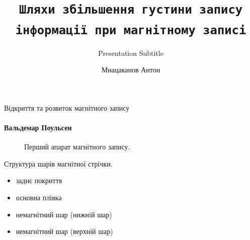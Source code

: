 \documentclass{beamer}
\title{\texttt{Шляхи збiльшення густини запису iнформацiї при магнiтному записi}} %
\subtitle{Presentation Subtitle} %
\author{Мнацаканов Антон}
\begin{document}
  \shorthandoff{-}
  \frame[c]{\maketitle}



    \begin{frame}{Відкриття та розвиток магнітного запису}
      \framesubtitle{Вальдемар Поульсен}%
        \begin{figure}[h]
          \caption{Перший апарат магнітного запису.}
          
        \end{figure}
    \end{frame}
    \begin{frame}[label=lists]{Структура шарів магнітної стрічки.}
 \begin{figure}[h]
  \end{figure}
  \begin{itemize}
    \item заднє покриття
    \item основна плівка
    \item немагнітний шар (нижній шар)
    \item немагнітний шар (верхній шар) 
  \end{itemize}
    \end{frame}
\end{document}
